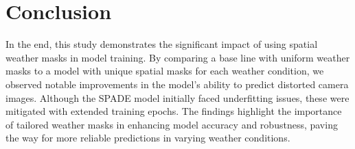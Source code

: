 \chapter{Conclusion}
In the end, this study demonstrates the significant impact of using spatial weather masks in model training.
By comparing a base line with uniform weather masks to a model with unique spatial masks for each weather condition, we observed notable improvements in the model’s ability to predict distorted camera images. Although the SPADE model initially faced underfitting issues, these were mitigated with extended training epochs.
The findings highlight the importance of tailored weather masks in enhancing model accuracy and robustness, paving the way for more reliable predictions in varying weather conditions.